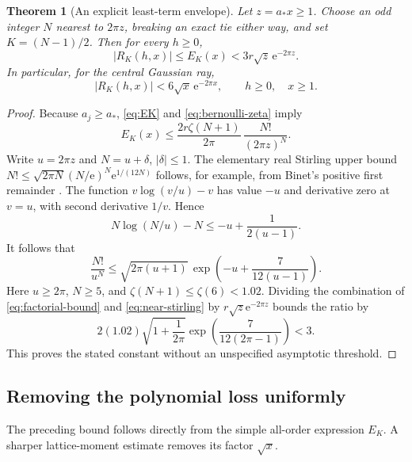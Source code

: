\documentclass[11pt,a4paper]{article}
\numberwithin{equation}{section}
\newtheorem{theorem}{Theorem}[section]
\theoremstyle{definition}\newtheorem{definition}[theorem]{Definition}
\theoremstyle{remark}\newtheorem{remark}[theorem]{Remark}
\newcommand{\e}{\mathrm e}
\newcommand{\amin}{a_*}
\begin{document}
\begin{theorem}[An explicit least-term envelope]
\label{thm:exponential}
Let $z=\amin x\ge1$. Choose an odd integer $N$ nearest to $2\pi z$, breaking
an exact tie either way, and set $K=(N-1)/2$. Then for every $h\ge0$,
\begin{equation}
 |R_K(h,x)|\le E_K(x)
       <3r\sqrt z\,\e^{-2\pi z}.
 \label{eq:exponential}
\end{equation}
In particular, for the central Gaussian ray,
\begin{equation}
 |R_K(h,x)|<6\sqrt x\,\e^{-2\pi x},\qquad h\ge0,\quad x\ge1.
 \label{eq:central-exponential}
\end{equation}
\end{theorem}
\begin{proof}
Because $a_j\ge\amin$, \eqref{eq:EK} and \eqref{eq:bernoulli-zeta} imply
\begin{equation}
 E_K(x)\le\frac{2r\zeta(N+1)}{2\pi}\,
                  \frac{N!}{(2\pi z)^N}.
 \label{eq:factorial-bound}
\end{equation}
Write $u=2\pi z$ and $N=u+\delta$, $|\delta|\le1$. The elementary real Stirling
upper bound $N!\le\sqrt{2\pi N}(N/\e)^N\e^{1/(12N)}$ follows, for example,
from Binet's positive first remainder \cite{dlmf-gamma-asymp}. The function
$v\log(v/u)-v$ has value $-u$ and derivative zero at $v=u$, with second
derivative $1/v$. Hence
\[
 N\log(N/u)-N\le-u+\frac1{2(u-1)}.
\]
It follows that
\begin{equation}
 \frac{N!}{u^N}\le\sqrt{2\pi(u+1)}\,
        \exp\left(-u+\frac7{12(u-1)}\right).
 \label{eq:near-stirling}
\end{equation}
Here $u\ge2\pi$, $N\ge5$, and $\zeta(N+1)\le\zeta(6)<1.02$.
Dividing the combination of \eqref{eq:factorial-bound} and
\eqref{eq:near-stirling} by $r\sqrt z\e^{-2\pi z}$ bounds the ratio by
\[
 2(1.02)\sqrt{1+\frac1{2\pi}}
           \exp\left(\frac7{12(2\pi-1)}\right)<3.
\]
This proves the stated constant without an unspecified asymptotic threshold.
\end{proof}

\subsection{Removing the polynomial loss uniformly}
The preceding bound follows directly from the simple all-order expression
$E_K$. A sharper lattice-moment estimate removes its factor $\sqrt{x}$.
\end{document}
